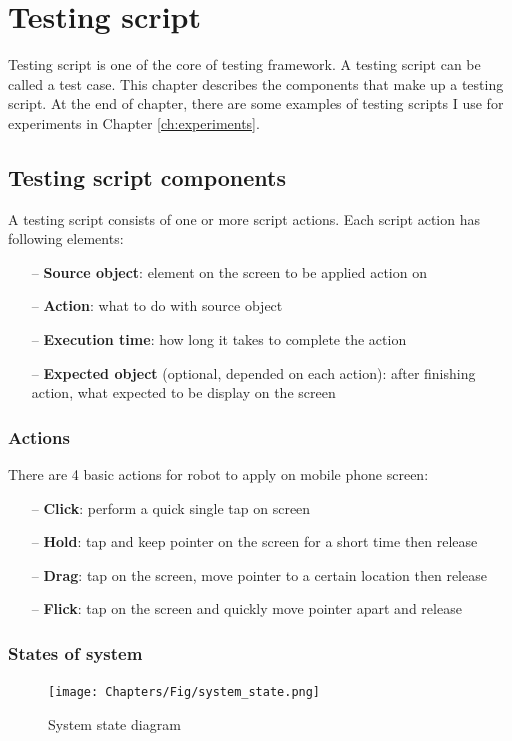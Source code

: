 \chapter{Testing script}
Testing script is one of the core of testing framework.
A testing script can be called a test case.
This chapter describes the components that make up a testing script. At the end of chapter, there are some examples of testing scripts I use for experiments in Chapter \ref{ch:experiments}.

\section{Testing script components}
A testing script consists of one or more script actions. Each script action has following elements:
    \begin{itemize}
		\item[--] \textbf{Source object}: element on the screen to be applied action on
		\item[--] \textbf{Action}: what to do with source object
		\item[--] \textbf{Execution time}: how long it takes to complete the action
		\item[--] \textbf{Expected object} (optional, depended on each action): after finishing action, what expected to be display on the screen
	\end{itemize}

\subsection{Actions}
There are 4 basic actions for robot to apply on mobile phone screen:
    \begin{itemize}
		\item[--] \textbf{Click}: perform a quick single tap on screen
		\item[--] \textbf{Hold}: tap and keep pointer on the screen for a short time then release
		\item[--] \textbf{Drag}: tap on the screen, move pointer to a certain location then release
		\item[--] \textbf{Flick}: tap on the screen and quickly move pointer apart and release
	\end{itemize}

\subsection{States of system}
    \begin{figure}
		\centering
		\texttt{[image: Chapters/Fig/system\_state.png]}
		\caption{System state diagram}
		\label{fig:system_state}
	\end{figure}


